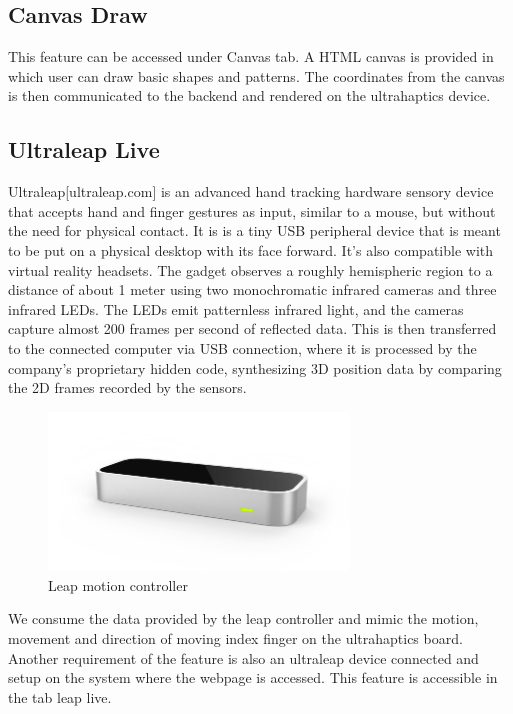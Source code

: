 \subsection*{Canvas Draw}
This feature can be accessed under Canvas tab. A HTML 
canvas is provided in which user can draw basic shapes and patterns. 
The coordinates from the canvas is then communicated to the backend and 
rendered on the ultrahaptics device. 

\subsection*{Ultraleap Live}

Ultraleap[ultraleap.com] is an advanced hand tracking  hardware sensory device that accepts hand and 
finger gestures as input, similar to a mouse, but without the need for physical contact.
It is is a tiny USB peripheral device that is meant to be put on a physical desktop 
with its face forward. It's also compatible with virtual reality headsets. 
The gadget observes a roughly hemispheric region to a distance of about 1 meter using 
two monochromatic infrared cameras and three infrared LEDs\cite{s130506380}. The LEDs emit patternless 
infrared light, and the cameras capture almost 200 frames per second of reflected data\cite{leap-controller}. 
This is then transferred to the connected computer via USB connection, where it is processed 
by the company's proprietary hidden code, synthesizing 3D position data by comparing the 
2D frames recorded by the sensors. \\

\begin{figure}[htb]
	\includegraphics[width=80mm]{gfx/motion-leap.png}
	\caption{Leap motion controller}
	\label{fig:features:csvinput}
\end{figure}
We consume the data provided by the leap controller and mimic the motion, movement and direction of 
moving index finger on the ultrahaptics board. Another requirement of the feature 
is also an ultraleap device connected and 
setup on the system where the webpage is accessed. This feature is accessible in the tab leap 
live. \\

